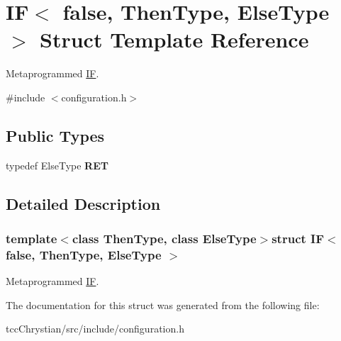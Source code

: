 \hypertarget{structIF_3_01false_00_01ThenType_00_01ElseType_01_4}{\section{I\-F$<$ false, Then\-Type, Else\-Type $>$ Struct Template Reference}
\label{structIF_3_01false_00_01ThenType_00_01ElseType_01_4}
}


Metaprogrammed \hyperlink{structIF}{I\-F}.  




{\ttfamily \#include $<$configuration.\-h$>$}

\subsection*{Public Types}
\begin{DoxyCompactItemize}
\item 
\hypertarget{structIF_3_01false_00_01ThenType_00_01ElseType_01_4_aa7d9ee5d71d3235a17de49470e2a00a0}{typedef Else\-Type {\bfseries R\-E\-T}}\label{structIF_3_01false_00_01ThenType_00_01ElseType_01_4_aa7d9ee5d71d3235a17de49470e2a00a0}

\end{DoxyCompactItemize}


\subsection{Detailed Description}
\subsubsection*{template$<$class Then\-Type, class Else\-Type$>$struct I\-F$<$ false, Then\-Type, Else\-Type $>$}

Metaprogrammed \hyperlink{structIF}{I\-F}. 

The documentation for this struct was generated from the following file\-:\begin{DoxyCompactItemize}
\item 
tcc\-Chrystian/src/include/configuration.\-h\end{DoxyCompactItemize}
